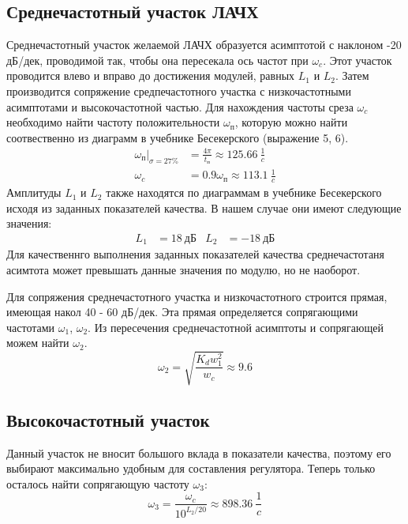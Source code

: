 \documentclass[a4paper, 12pt]{article}
\begin{document}
\subsection{Среднечастотный участок ЛАЧХ}
Среднечастотный участок желаемой ЛАЧХ образуется асимптотой с наклоном -20 дБ/дек, проводимой так, чтобы она пересекала ось частот при $\omega_c$. Этот участок проводится влево и вправо до достижения модулей, равных $L_1$ и $L_2$. Затем производится сопряжение средпечастотного участка с низкочастотными асимптотами и высокочастотной частью. Для нахождения частоты среза $\omega_c$ необходимо найти частоту положительности $\omega_\text{п}$, которую можно найти соотвественно из диаграмм в учебнике Бесекерского (выражение 5, 6).
\begin{align}
    \omega_\text{п}|_{\sigma = 27\%} & = \frac{4\pi}{t_\text{п}} \approx 125.66\ \frac{1}{c} \\
    \omega_c & = 0.9\omega_\text{п} \approx 113.1\ \frac{1}{c} 
\end{align}
Амплитуды $L_1$ и $L_2$ также находятся по диаграммам в учебнике Бесекерского исходя из заданных показателей качества. В нашем случае они имеют следующие значения:
\begin{align*}
    L_1 & = 18\ \text{дБ} & L_2 & = -18\ \text{дБ}
\end{align*}
Для качественнго выполнения заданных показателей качества среднечастотаня асимтота может превышать данные значения по модулю, но не наоборот. \par
Для сопряжения среднечастотного участка и низкочастотного строится прямая, имеющая накол 40 - 60 дБ/дек. Эта прямая определяется сопрягающими частотами $\omega_1$, $\omega_2$. Из пересечения среднечастотной асимптоты и сопрягающей можем найти $\omega_2$.
\begin{equation}
    \omega_2 = \sqrt{\frac{K_dw_1^2}{w_c}} \approx 9.6
\end{equation}\par

\subsection{Высокочастотный участок}
Данный участок не вносит большого вклада в показатели качества, поэтому его выбирают максимально удобным для составления регулятора.
Теперь только осталось найти сопрягающую частоту $\omega_{3}$:
\begin{equation}
    \omega_{3} = \frac{\omega_c}{10^{L_2/20}} \approx 898.36\ \frac{1}{c}
\end{equation}
\end{document}
